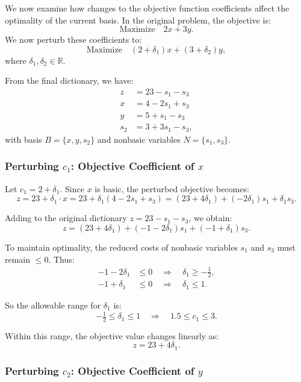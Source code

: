 We now examine how changes to the objective function coefficients affect the optimality of the current basis. In the original problem, the objective is:
\[
\text{Maximize} \quad 2x + 3y.
\]
We now perturb these coefficients to:
\[
\text{Maximize} \quad (2 + \delta_1)x + (3 + \delta_2)y,
\]
where \( \delta_1, \delta_2 \in \mathbb{R} \).

From the final dictionary, we have:
\[
\begin{aligned}
z &= 23 - s_1 - s_3 \\
x &= 4 - 2s_1 + s_3 \\
y &= 5 + s_1 - s_3 \\
s_2 &= 3 + 3s_1 - s_3,
\end{aligned}
\]
with basis \( B = \{x, y, s_2\} \) and nonbasic variables \( N = \{s_1, s_3\} \).

\subsubsection*{Perturbing \( c_1 \): Objective Coefficient of \( x \)}

Let \( c_1 = 2 + \delta_1 \). Since \( x \) is basic, the perturbed objective becomes:
\[
z = 23 + \delta_1 \cdot x = 23 + \delta_1(4 - 2s_1 + s_3)
= (23 + 4\delta_1) + (-2\delta_1)s_1 + \delta_1 s_3.
\]

Adding to the original dictionary \( z = 23 - s_1 - s_3 \), we obtain:
\[
z = (23 + 4\delta_1) + (-1 - 2\delta_1)s_1 + (-1 + \delta_1)s_3.
\]

To maintain optimality, the reduced costs of nonbasic variables \( s_1 \) and \( s_3 \) must remain \( \leq 0 \). Thus:
\[
\begin{aligned}
-1 - 2\delta_1 &\leq 0 \quad \Rightarrow \quad \delta_1 \geq -\tfrac{1}{2}, \\
-1 + \delta_1 &\leq 0 \quad \Rightarrow \quad \delta_1 \leq 1.
\end{aligned}
\]

So the allowable range for \( \delta_1 \) is:
\[
\boxed{-\tfrac{1}{2} \leq \delta_1 \leq 1} \quad \Rightarrow \quad \boxed{1.5 \leq c_1 \leq 3}.
\]

Within this range, the objective value changes linearly as:
\[
z = 23 + 4\delta_1.
\]

\subsubsection*{Perturbing \( c_2 \): Objective Coefficient of \( y \)}

